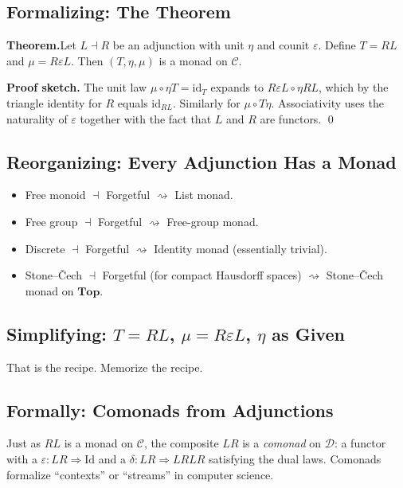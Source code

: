 \subsection{Formalizing: The Theorem}

\textbf{Theorem.}\quad Let $L \dashv R$ be an adjunction with unit $\eta$
and counit $\varepsilon$. Define $T = R L$ and $\mu = R \varepsilon L$.
Then $(T, \eta, \mu)$ is a monad on $\mathcal{C}$.

\textbf{Proof sketch.} The unit law $\mu \circ \eta T = \mathrm{id}_T$
expands to $R \varepsilon L \circ \eta R L$, which by the triangle
identity for $R$ equals $\mathrm{id}_{R L}$. Similarly for $\mu \circ T
\eta$. Associativity uses the naturality of $\varepsilon$ together with
the fact that $L$ and $R$ are functors. \qed

\subsection{Reorganizing: Every Adjunction Has a Monad}

\begin{itemize}
  \item Free monoid $\dashv$ Forgetful $\rightsquigarrow$ List monad.
  \item Free group $\dashv$ Forgetful $\rightsquigarrow$ Free-group monad.
  \item Discrete $\dashv$ Forgetful $\rightsquigarrow$ Identity monad
        (essentially trivial).
  \item Stone--\v{C}ech $\dashv$ Forgetful (for compact Hausdorff spaces)
        $\rightsquigarrow$ Stone--\v{C}ech monad on $\mathbf{Top}$.
\end{itemize}

\subsection{Simplifying: $T = R L$, $\mu = R \varepsilon L$, $\eta$ as Given}

That is the recipe. Memorize the recipe.

\subsection{Formally: Comonads from Adjunctions}

Just as $R L$ is a monad on $\mathcal{C}$, the composite $L R$ is a
\emph{comonad} on $\mathcal{D}$: a functor with a 
$\varepsilon : L R \Rightarrow \mathrm{Id}$ and a 
$\delta : L R \Rightarrow L R L R$ satisfying the dual laws. Comonads
formalize ``contexts'' or ``streams'' in computer science.


